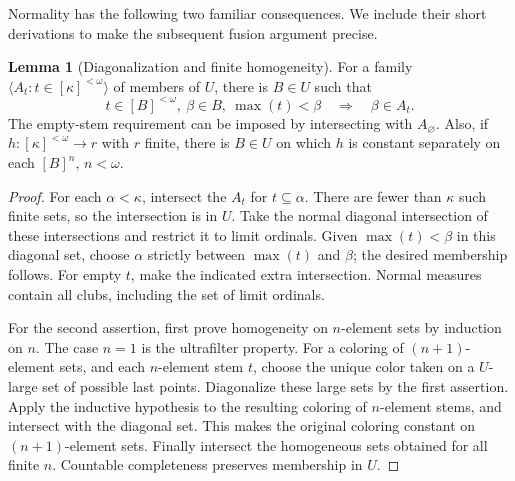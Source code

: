 \documentclass[11pt,letterpaper]{article}
\theoremstyle{definition}
\newtheorem{lemma}[definition]{Lemma}
\numberwithin{equation}{section}
\begin{document}
Normality has the following two familiar consequences. We include their
short derivations to make the subsequent fusion argument precise.

\begin{lemma}[Diagonalization and finite homogeneity]\label{lem:normal}
For a family $\langle A_t:t\in[\kappa]^{<\omega}\rangle$ of members of $U$,
there is $B\in U$ such that
\[
 t\in[B]^{<\omega},\ \beta\in B,\ \max(t)<\beta
 \quad\Longrightarrow\quad \beta\in A_t.
\]
The empty-stem requirement can be imposed by intersecting with
$A_\varnothing$. Also, if $h:[\kappa]^{<\omega}\to r$ with $r$ finite,
there is $B\in U$ on which $h$ is constant separately on each
$[B]^n$, $n<\omega$.
\end{lemma}
\begin{proof}
For each $\alpha<\kappa$, intersect the $A_t$ for $t\subseteq\alpha$.
There are fewer than $\kappa$ such finite sets, so the intersection is in $U$.
Take the normal diagonal intersection of these intersections and restrict
it to limit ordinals. Given $\max(t)<\beta$ in this diagonal set, choose
$\alpha$ strictly between $\max(t)$ and $\beta$; the desired membership
follows. For empty $t$, make the indicated extra intersection. Normal
measures contain all clubs, including the set of limit ordinals.

For the second assertion, first prove homogeneity on $n$-element sets by
induction on $n$. The case $n=1$ is the ultrafilter property. For a coloring
of $(n+1)$-element sets, and each $n$-element stem $t$, choose the unique
color taken on a $U$-large set of possible last points. Diagonalize these
large sets by the first assertion. Apply the inductive hypothesis to the
resulting coloring of $n$-element stems, and intersect with the diagonal
set. This makes the original coloring constant on $(n+1)$-element sets.
Finally intersect the homogeneous sets obtained for all finite $n$.
Countable completeness preserves membership in $U$.
\end{proof}
\end{document}
